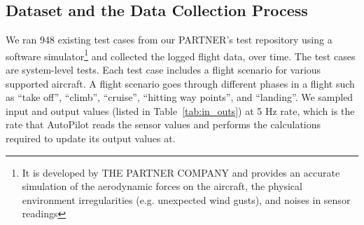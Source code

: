 \subsection{Dataset and the Data Collection Process}
We ran 948 existing test cases from our PARTNER's test repository using a software simulator\footnote{It is developed by THE PARTNER COMPANY and provides an accurate simulation of the aerodynamic forces on the aircraft, the physical environment irregularities (e.g. unexpected wind gusts), and noises in sensor readings} and collected the logged flight data, over time. The test cases are system-level tests. Each test case includes a flight scenario for various supported aircraft. A flight scenario goes through different phases in a flight such as ``take off'', ``climb'', ``cruise'', ``hitting way points'', and ``landing''.
We sampled input and output values (listed in Table~\ref{tab:in_outs}) at 5 Hz rate, which is the rate that AutoPilot reads the sensor values and performs the calculations required to update its output values at.
